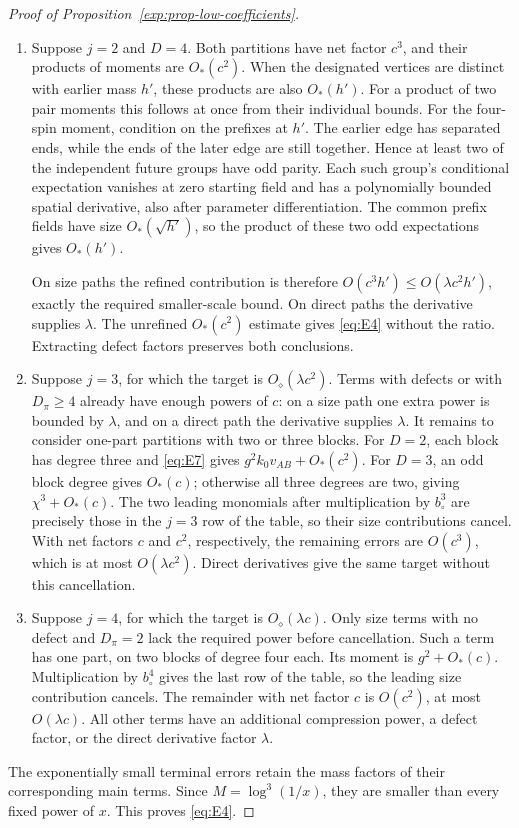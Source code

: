 \begin{proof}[Proof of Proposition~\ref{exp:prop-low-coefficients}]
\begin{enumerate}
\item Suppose \(j=2\) and \(D=4\). Both partitions have net
factor \(c^3\), and their products of moments are \(O_*(c^2)\).
When the designated vertices are distinct with earlier mass \(h'\),
these products are also \(O_*(h')\). For a product of two pair
moments this follows at once from their individual bounds. For the
four-spin moment, condition on the prefixes at \(h'\). The earlier
edge has separated ends, while the ends of the later edge are still
together. Hence at least two of the independent future groups have
odd parity. Each such group's conditional expectation vanishes at
zero starting field and has a polynomially bounded spatial
derivative, also after parameter differentiation. The common prefix
fields have size \(O_*(\sqrt{h'})\), so the product of these two
odd expectations gives \(O_*(h')\).

On size paths the refined contribution is therefore
\(O(c^3h')\le O(\lambda c^2h')\), exactly the required smaller-scale
bound. On direct paths the derivative supplies \(\lambda\).
The unrefined \(O_*(c^2)\) estimate gives \eqref{eq:E4} without the
ratio. Extracting defect factors preserves both conclusions.

\item Suppose \(j=3\), for which the target is
\(O_\diamond(\lambda c^2)\). Terms with defects or with
\(D_\pi\ge4\) already have enough powers of \(c\): on a size
path one extra power is bounded by \(\lambda\), and on a direct
path the derivative supplies \(\lambda\). It remains to consider
one-part partitions with two or three blocks.
For \(D=2\), each block has degree three and \eqref{eq:E7} gives
\(g^2k_0v_{AB}+O_*(c^2)\). For \(D=3\), an odd block degree gives
\(O_*(c)\); otherwise all three degrees are two, giving
\(\chi^3+O_*(c)\). The two leading monomials after multiplication
by \(b_\circ^3\) are precisely those in the \(j=3\) row of the
table, so their size contributions cancel. With net factors \(c\)
and \(c^2\), respectively, the remaining errors are \(O(c^3)\),
which is at most \(O(\lambda c^2)\). Direct derivatives give the
same target without this cancellation.

\item Suppose \(j=4\), for which the target is
\(O_\diamond(\lambda c)\). Only size terms with no defect and
\(D_\pi=2\) lack the required power before cancellation. Such a
term has one part, on two blocks of degree four each. Its moment is
\(g^2+O_*(c)\). Multiplication by \(b_\circ^4\) gives the last
row of the table, so the leading size contribution cancels. The
remainder with net factor \(c\) is \(O(c^2)\), at most
\(O(\lambda c)\). All other terms have an additional compression
power, a defect factor, or the direct derivative factor
\(\lambda\).
\end{enumerate}
The exponentially small terminal errors retain the mass factors of
their corresponding main terms. Since \(M=\log^3(1/x)\), they are
smaller than every fixed power of \(x\). This proves \eqref{eq:E4}.
\end{proof}

